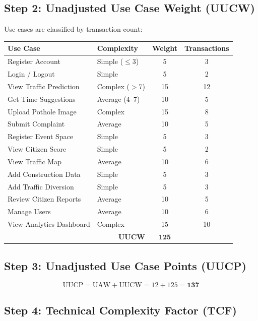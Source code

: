 \documentclass[12pt,a4paper]{article}
\begin{document}
\subsection{Step 2: Unadjusted Use Case Weight (UUCW)}

Use cases are classified by transaction count:
\begin{center}
\begin{tabular}{llcc}
\toprule
\textbf{Use Case} & \textbf{Complexity} & \textbf{Weight} & \textbf{Transactions} \\
\midrule
Register Account & Simple ($\leq$3) & 5 & 3 \\
Login / Logout & Simple & 5 & 2 \\
View Traffic Prediction & Complex ($>$7) & 15 & 12 \\
Get Time Suggestions & Average (4--7) & 10 & 5 \\
Upload Pothole Image & Complex & 15 & 8 \\
Submit Complaint & Average & 10 & 5 \\
Register Event Space & Simple & 5 & 3 \\
View Citizen Score & Simple & 5 & 2 \\
View Traffic Map & Average & 10 & 6 \\
Add Construction Data & Simple & 5 & 3 \\
Add Traffic Diversion & Simple & 5 & 3 \\
Review Citizen Reports & Average & 10 & 5 \\
Manage Users & Average & 10 & 6 \\
View Analytics Dashboard & Complex & 15 & 10 \\
\midrule
\multicolumn{2}{r}{\textbf{UUCW}} & $\mathbf{125}$ & \\
\bottomrule
\end{tabular}
\end{center}

\subsection{Step 3: Unadjusted Use Case Points (UUCP)}

\[
\text{UUCP} = \text{UAW} + \text{UUCW} = 12 + 125 = \mathbf{137}
\]

\subsection{Step 4: Technical Complexity Factor (TCF)}
\end{document}
